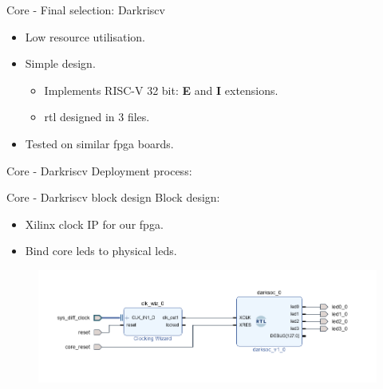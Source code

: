 \begin{frame}{Core - Final selection: Darkriscv}
  \begin{itemize}
    \item Low resource utilisation.
    \item Simple design.
    \begin{itemize}
      \item Implements RISC-V 32 bit: \textbf{E} and \textbf{I} extensions.
      \item \gls{rtl} designed in 3 files. 
    \end{itemize}
    \item Tested on similar \gls{fpga} boards.
  \end{itemize}
\end{frame}

\begin{frame}{Core - Darkriscv}
  Deployment process:
 \begin{center}
  \end{center}
\end{frame}

\begin{frame}{Core - Darkriscv block design}
  Block design:
  \begin{itemize}
    \item Xilinx clock IP for our \gls{fpga}.
    \item Bind core leds to physical leds.
  \end{itemize}
 \begin{center}
\begin{figure}[!ht]
    \includegraphics[width=1\linewidth]{images/block-design.png}
\end{figure}
  \end{center}
\end{frame}